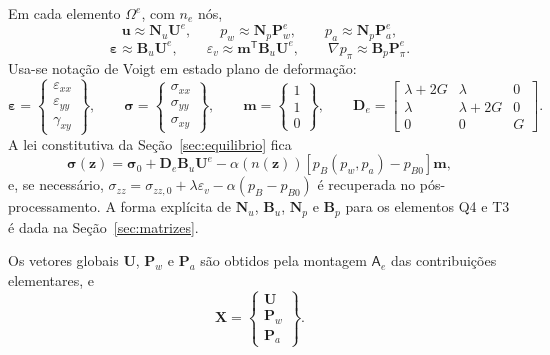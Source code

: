 \documentclass[11pt,a4paper]{article}
\begin{document}
Em cada elemento $\Omega^e$, com $n_e$ nós,
\begin{equation*}
\boxed{\mathbf u\approx\mathbf N_u\mathbf U^e,\qquad
p_w\approx\mathbf N_p\mathbf P_w^e,\qquad
p_a\approx\mathbf N_p\mathbf P_a^e,}
\end{equation*}
\begin{equation*}
\boxed{\boldsymbol\varepsilon\approx\mathbf B_u\mathbf U^e,\qquad
\varepsilon_v\approx\mathbf m^{\mathsf T}\mathbf B_u\mathbf U^e,\qquad
\nabla p_\pi\approx\mathbf B_p\mathbf P_\pi^e.}
\end{equation*}
Usa-se notação de Voigt em estado plano de deformação:
\begin{equation*}
\boldsymbol\varepsilon=\begin{Bmatrix}\varepsilon_{xx}\\ \varepsilon_{yy}\\ \gamma_{xy}\end{Bmatrix},
\qquad
\boldsymbol\sigma=\begin{Bmatrix}\sigma_{xx}\\ \sigma_{yy}\\ \sigma_{xy}\end{Bmatrix},
\qquad
\mathbf m=\begin{Bmatrix}1\\1\\0\end{Bmatrix},
\qquad
\mathbf D_e=\begin{bmatrix}\lambda+2G&\lambda&0\\ \lambda&\lambda+2G&0\\ 0&0&G\end{bmatrix}.
\end{equation*}
A lei constitutiva da Seção~\ref{sec:equilibrio} fica
\begin{equation*}
\boxed{\boldsymbol\sigma(\mathbf z)=\boldsymbol\sigma_0+\mathbf D_e\mathbf B_u\mathbf U^e
-\alpha(n(\mathbf z))\left[p_B(p_w,p_a)-p_{B0}\right]\mathbf m,}
\end{equation*}
e, se necessário, $\sigma_{zz}=\sigma_{zz,0}+\lambda\varepsilon_v-\alpha(p_B-p_{B0})$
é recuperada no pós-processamento. A forma explícita de $\mathbf N_u$,
$\mathbf B_u$, $\mathbf N_p$ e $\mathbf B_p$ para os elementos Q4 e T3
é dada na Seção~\ref{sec:matrizes}.

Os vetores globais $\mathbf U$, $\mathbf P_w$ e $\mathbf P_a$ são obtidos
pela montagem $\mathsf A_e$ das contribuições elementares, e
\begin{equation*}
\mathbf X=\begin{Bmatrix}\mathbf U\\ \mathbf P_w\\ \mathbf P_a\end{Bmatrix}.
\end{equation*}
\end{document}
